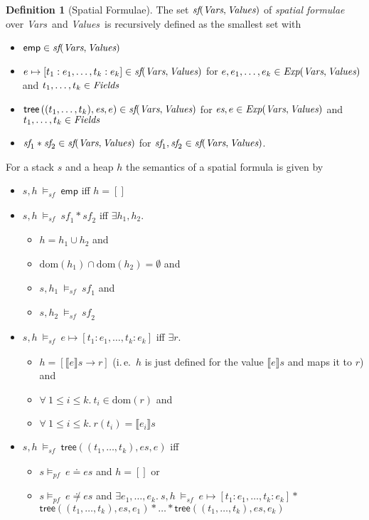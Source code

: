 \documentclass{scrartcl}
\theoremstyle{definition}
\newtheorem{definition}{Definition}
\newcommand{\pfequal}[2]{\ensuremath{#1 \doteq #2}}
\newcommand{\pfunequal}[2]{\ensuremath{#1 \not\doteq #2}}
\newcommand{\values}{{\emph{Values}}}
\newcommand{\vars}{{\emph{Vars}}}
\newcommand{\expr}{{\emph{Exp}}}
\newcommand{\fields}{{\emph{Fields}}}
\newcommand{\sfset}{{\emph{sf}}}
\newcommand{\modelspf}{{\models_{\textit{pf}}\ }}
\newcommand{\modelssf}{{\models_{\textit{sf}}\ }}
\newcommand{\sfemp}{{\textsf{emp}}}
\newcommand{\sftree}{{\textsf{tree}}}
\newcommand{\sfpointsto}[2]{#1 \mapsto [#2]}
\newcommand{\dom}{{\text{dom}}}
\begin{document}
\begin{definition}[Spatial Formulae]
  The set $\sfset(\vars,\values)$ of \emph{spatial formulae} over \vars\ and
  \values\ is recursively defined as the smallest set with
\begin{itemize}
\item $\sfemp \in \sfset(\vars,\values)$
\item $\sfpointsto{e}{t_1:e_1, \ldots, t_k:e_k} \in \sfset(\vars,\values)$ for 
  $e, e_1, \ldots, e_k \in  \expr(\vars,\values)$ and $t_1, \ldots, t_k \in \fields$
\item $\sftree\left((t_1, \ldots, t_k),\textit{es},e\right) \in \sfset(\vars,\values)$
  for $\textit{es}, e \in \expr(\vars,\values)$ and\\$t_1, \ldots, t_k \in \fields$
\item $\textit{sf}_1 * \textit{sf}_2 \in \sfset(\vars,\values)$ for
  $\textit{sf}_1, \textit{sf}_2 \in \sfset(\vars,\values)$.
\end{itemize}
\bigskip
%
For a stack $s$ and a heap $h$ the semantics of a spatial formula is given by
\begin{itemize}
\item $s, h\ \modelssf \sfemp$ iff $h = []$
\item $s, h\ \modelssf \textit{sf}_1 * \textit{sf}_2$ iff $\exists h_1, h_2.$
  \begin{itemize}
  \item $h = h_1 \cup h_2$ and 
  \item $\dom(h_1) \cap \dom(h_2) = \emptyset$ and
  \item $s, h_1\ \modelssf \textit{sf}_1$ and
  \item $s, h_2\ \modelssf \textit{sf}_2$
  \end{itemize}
\item $s, h\ \modelssf \sfpointsto{e}{t_1:e_1, \ldots, t_k:e_k}$ iff $\exists r.$
  \begin{itemize}
  \item $h = \left[ \llbracket e \rrbracket s \to r \right]$ (i.\,e.\ $h$ is
    just defined for the value $\llbracket e \rrbracket s$ and maps it to $r$) and
  \item $\forall\ 1 \leq i \leq k.\ t_i \in \dom(r)$ and
  \item $\forall\ 1 \leq i \leq k.\ r(t_i) = \llbracket e_i \rrbracket s$
  \end{itemize}
\item $s, h\ \modelssf \sftree\left((t_1, \ldots, t_k),\textit{es},e\right)$ iff 
\begin{itemize}
  \item $s \modelspf \pfequal{e}{es}$ and $h = []$ or
  \item $s \modelspf \pfunequal{e}{es}$ and $\exists
  e_1, \ldots, e_k.\ s, h\ \modelssf \sfpointsto{e}{t_1:e_1, \ldots, t_k:e_k}
  *$\\$\sftree\left((t_1, \ldots, t_k),\textit{es},e_1\right) * \ldots * \sftree\left((t_1,
  \ldots, t_k),\textit{es},e_k\right)$ 
\end{itemize}
\end{itemize}
\end{definition}
\end{document}
